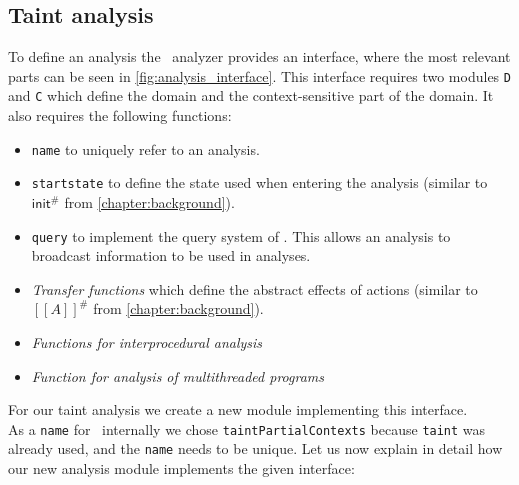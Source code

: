     \subsection{Taint analysis}\label{section:implTaint}
      To define an analysis the \gob\ analyzer provides an interface, where the most relevant parts can be seen in \autoref{fig:analysis_interface}. This interface requires two modules \texttt{D} and \texttt{C} which define the domain and the context-sensitive part of the domain. It also requires the following functions: 
      \begin{itemize}
        \item \texttt{name} to uniquely refer to an analysis.
        \item \texttt{startstate} to define the state used when entering the analysis (similar to $\textsf{init}^{\#}$ from \autoref{chapter:background}).
        \item \texttt{query} to implement the query system of \gob. This allows an analysis to broadcast information to be used in analyses.
        \item \textit{Transfer functions} which define the abstract effects of actions (similar to $[\![A]\!]^{\#}$ from \autoref{chapter:background}).
        \item \textit{Functions for interprocedural analysis}
        \item \textit{Function for analysis of multithreaded programs}
      \end{itemize}

      For our taint analysis we create a new module implementing this interface.\\
      As a \texttt{name} for \gob\ internally we chose \texttt{taintPartialContexts} because \texttt{taint} was already used, and the \texttt{name} needs to be unique. Let us now explain in detail how our new analysis module implements the given interface:
